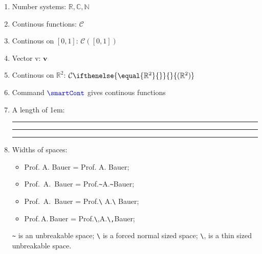 \documentclass[a4paper]{article}
\newcommand{\numR}{\mathbb{R}}
\newcommand{\numC}{\mathbb{C}}
\newcommand{\numN}{\mathbb{N}}
\newcommand{\cont}{\mathcal{C}}
\newcommand{\continousOn}[1]{\cont(#1)}
\newcommand{\vect}[1]{\mathbf{#1}}
\newcommand{\smartCont}[1][]{
    \cont%
    \ifthenelse{\equal{#1}{}}
        {}
        {(#1)}
}
\newcommand{\cmd}[1]{\textcolor{blue}{\texttt{\textbackslash#1}}}
\newcommand{\demolength}[1]{
    \rule{.1pt}{.5em}%
    \rule{#1}{.1pt}%
    \rule{.1pt}{.5em}
}
\begin{document}
\Large
\begin{enumerate}
    \item Number systems: $\numR, \numC, \numN$
    \item Continous functions: $\cont$
    \item Continous on $[0,1]$: $\continousOn{[0,1]}$
    \item Vector v: $\vect{v}$
    \item Continous on $\numR^2$: $\smartCont[\numR^2]$
    \item Command $\cmd{smartCont}$ gives continous functions
    \item A length of 1em: \demolength{1em}
    \item Widths of spaces:
    \begin{itemize}
        \item Prof. A. Bauer = Prof. A. Bauer;
        \item Prof.~A.~Bauer = Prof.\texttt{\textasciitilde}A.\texttt{\textasciitilde}Bauer;
        \item Prof.\ A.\ Bauer = Prof.\texttt{\textbackslash} A.\texttt{\textbackslash} Bauer;
        \item Prof.\,A.\,Bauer = Prof.\texttt{\textbackslash},A.\texttt{\textbackslash,}Bauer;
    \end{itemize}
    \texttt{\textasciitilde} is an unbreakable space;
    \texttt{\textbackslash}  is a forced normal sized space;
    \texttt{\textbackslash}, is a thin sized unbreakable space.
\end{enumerate}
\end{document}
